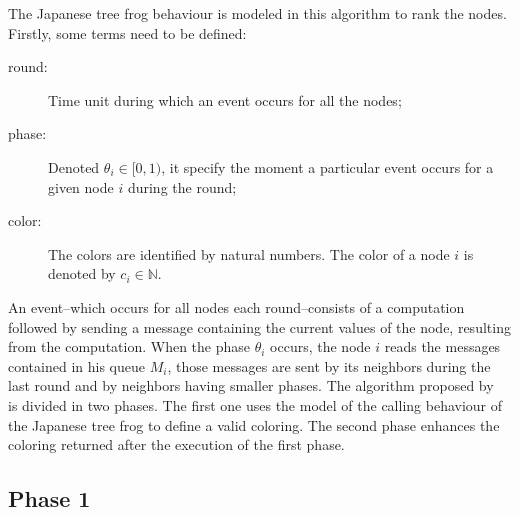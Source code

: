 \documentclass[letterpaper]{article}
\begin{document}
The Japanese tree frog behaviour is modeled in this algorithm to rank the nodes. Firstly, some terms need to be defined:

\begin{description}
\item[round:] Time unit during which an event occurs for all the nodes;
\item[phase:] Denoted $\theta_i \in [0,1)$, it specify the moment a particular  event occurs for a given node $i$ during the round;
\item[color:] The colors are identified by natural numbers. The color of a node $i$ is denoted by $c_i \in \mathbb{N}$.
\end{description}

An event--which occurs for all nodes each round--consists of a computation followed by sending a message containing the current values of the node, resulting from the computation. When the phase $\theta_i$ occurs, the node $i$ reads the messages contained in his queue $M_i$, those messages are sent by its neighbors during the last round and by neighbors having smaller phases. The algorithm proposed by~\cite{HB10} is divided in two phases. The first one uses the model of the calling behaviour of the Japanese tree frog to define a valid coloring. The second phase enhances the coloring returned after the execution of the first phase.

\subsection{Phase 1}

\end{document}
